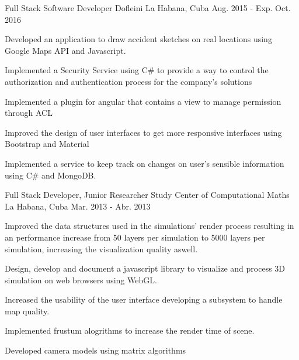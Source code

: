 


\begin{cventries}


\cventry
{Full Stack Software Developer} %
{Dofleini} %
{La Habana, Cuba} %
{Aug. 2015 - Exp. Oct. 2016} %
{ %
\begin{cvitems}
\item {Developed an application to draw accident sketches on real locations using Google Maps API and
Javascript.}
\item {Implemented a Security Service using C\# to provide a way to control the authorization and authentication
process for the company's solutions}
\item {Implemented a plugin for angular that contains a view to manage permission through ACL}
\item {Improved the design of user interfaces to get more responsive interfaces using Bootstrap and Material}
\item {Implemented a service to keep track on changes on user's sensible information using C\# and MongoDB.}
\end{cvitems}
}


\cventry
{Full Stack Developer, Junior Researcher} %
{Study Center of Computational Maths} %
{La Habana, Cuba} %
{Mar. 2013 - Abr. 2013} %
{ %
\begin{cvitems}
\item {Improved the data structures used in the simulations' render process resulting in an
performance increase from 50 layers per simulation to 5000 layers per simulation, increasing the visualization quality aswell.}
\item {Design, develop and document a javascript library to visualize and process 3D simulation on web browsers
using WebGL.}
\item {Increased the usability of the user interface developing a subsystem to handle map quality.}
\item {Implemented frustum alogrithms to increase the render time of scene.}
\item {Developed camera models using matrix algorithms}
\end{cvitems}
}


\end{cventries}
